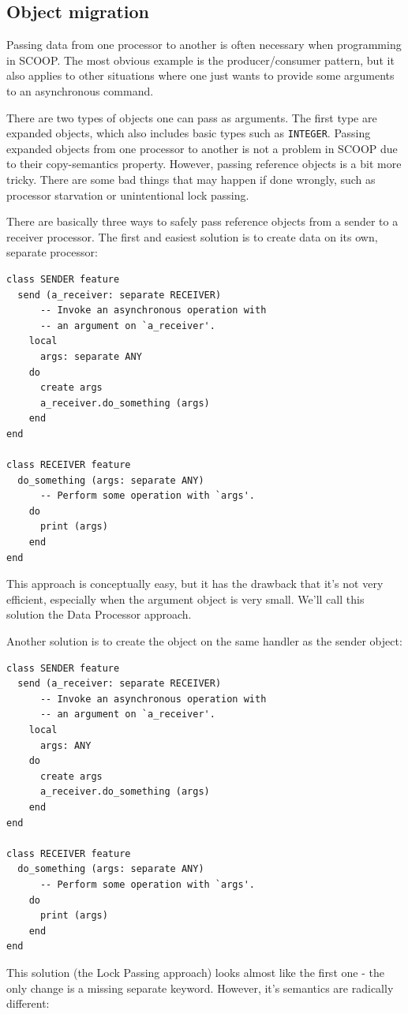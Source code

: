 \documentclass[a4paper,10pt]{article}
\begin{document}
\subsection{Object migration}
\label{sec:object-migration}

Passing data from one processor to another is often necessary when programming in SCOOP.
The most obvious example is the producer/consumer pattern, but it also applies to other situations where one just wants to provide some arguments to an asynchronous command.

There are two types of objects one can pass as arguments.
The first type are expanded objects, which also includes basic types such as \lstinline!INTEGER!.
Passing expanded objects from one processor to another is not a problem in SCOOP due to their copy-semantics property.
However, passing reference objects is a bit more tricky.
There are some bad things that may happen if done wrongly, such as processor starvation or unintentional lock passing.

There are basically three ways to safely pass reference objects from a sender to a receiver processor.
The first and easiest solution is to create data on its own, separate processor: 
\begin{lstlisting}[language=OOSC2Eiffel, captionpos=b, caption={Migrate objects on a separate processor.}]
class SENDER feature
  send (a_receiver: separate RECEIVER)
      -- Invoke an asynchronous operation with
      -- an argument on `a_receiver'.
    local
      args: separate ANY
    do
      create args
      a_receiver.do_something (args)
    end
end

class RECEIVER feature 
  do_something (args: separate ANY)
      -- Perform some operation with `args'.
    do
      print (args)
    end
end
\end{lstlisting}
This approach is conceptually easy, but it has the drawback that it's not very efficient, especially when the argument object is very small.
We'll call this solution the Data Processor approach.

Another solution is to create the object on the same handler as the sender object:
\begin{lstlisting}[language=OOSC2Eiffel, captionpos=b, caption={Migrate objects with lock passing.}]
class SENDER feature
  send (a_receiver: separate RECEIVER)
      -- Invoke an asynchronous operation with
      -- an argument on `a_receiver'.
    local
      args: ANY
    do
      create args
      a_receiver.do_something (args)
    end
end

class RECEIVER feature 
  do_something (args: separate ANY)
      -- Perform some operation with `args'.
    do
      print (args)
    end
end
\end{lstlisting}
This solution (the Lock Passing approach) looks almost like the first one - the only change is a missing separate keyword.
However, it's semantics are radically different:
\end{document}
